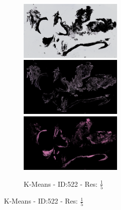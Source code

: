 \documentclass[letterpaper,10pt,oneside]{article}
\begin{document}
\begin{figure}[hbtp]
\begin{subfigure}[b]{5cm}
    \includegraphics[width=5cm]{visualization/results/kmeans/res_reduce_5/Region_0_PO13-00522A1_1_2_201305171639.png}
    \includegraphics[width=5cm]{visualization/results/kmeans/res_reduce_5/Region_2_PO13-00522A1_1_2_201305171639.png}
    \includegraphics[width=5cm]{visualization/results/kmeans/res_reduce_5/Region_1_PO13-00522A1_1_2_201305171639.png}
    \caption{K-Means - ID:522 - Res: $\frac{1}{5}$}
  \end{subfigure}
  

\end{figure}
\end{document}
